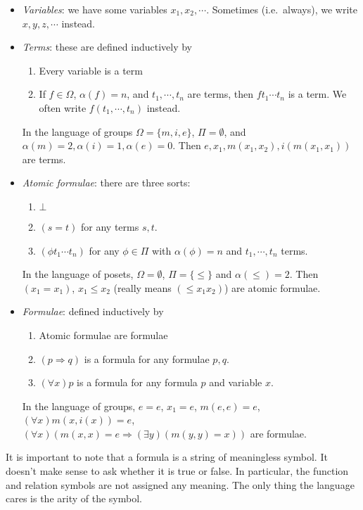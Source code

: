 \documentclass[a4paper]{article}
\begin{document}
\begin{defi}[Language]
  \begin{itemize}
    \item \emph{Variables}: we have some variables $x_1, x_2, \cdots$. Sometimes (i.e.\ always), we write $x, y, z, \cdots$ instead.
    \item \emph{Terms}: these are defined inductively by
      \begin{enumerate}
        \item Every variable is a term
        \item If $f\in \Omega$, $\alpha(f) = n$, and $t_1, \cdots, t_n$ are terms, then $ft_1\cdots t_n$ is a term. We often write $f(t_1, \cdots, t_n)$ instead.
      \end{enumerate}
      \begin{eg}
        In the language of groups $\Omega = \{m, i, e\}$, $\Pi = \emptyset$, and $\alpha (m) = 2, \alpha(i) = 1, \alpha(e) = 0$. Then $e, x_1, m(x_1, x_2), i(m(x_1, x_1))$ are terms.
      \end{eg}
    \item \emph{Atomic formulae}: there are three sorts:
      \begin{enumerate}
        \item $\bot$
        \item $(s = t)$ for any terms $s, t$.
        \item $(\phi t_1 \cdots t_n)$ for any $\phi\in \Pi$ with $\alpha(\phi) = n$ and $t_1, \cdots, t_n$ terms.
      \end{enumerate}
      \begin{eg}
        In the language of posets, $\Omega = \emptyset$, $\Pi=\{\leq\}$ and $\alpha(\leq) = 2$. Then $(x_1 = x_1)$, $x_1\leq x_2$ (really means $(\leq x_1x_2)$) are atomic formulae.
      \end{eg}
    \item \emph{Formulae}: defined inductively by
      \begin{enumerate}
        \item Atomic formulae are formulae
        \item $(p \Rightarrow q)$ is a formula for any formulae $p, q$.
        \item $(\forall x) p$ is a formula for any formula $p$ and variable $x$.
      \end{enumerate}
      \begin{eg}
        In the language of groups, $e = e$, $x_1 = e$, $m(e, e) = e$, $(\forall x) m(x, i(x)) = e$, $(\forall x)(m(x, x) = e \Rightarrow (\exists y) (m(y, y) = x))$ are formulae.
      \end{eg}
  \end{itemize}
\end{defi}
It is important to note that a formula is a string of meaningless symbol. It doesn't make sense to ask whether it is true or false. In particular, the function and relation symbols are not assigned any meaning. The only thing the language cares is the arity of the symbol.
\end{document}
